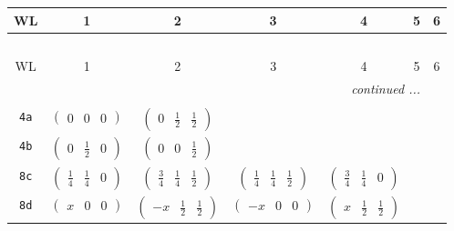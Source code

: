 \documentclass[fleqn,9pt,landscape]{jsarticle}
\begin{document}
\begin{center}
\renewcommand{\arraystretch}{1.2}
\begin{longtable}{ccccccc}
 \hline \hline
WL & 1 & 2 & 3 & 4 & 5 & 6 \\ \hline \endfirsthead

\multicolumn{6}{l}{\tablename\ \thetable{}} \\
 \hline \hline
WL & 1 & 2 & 3 & 4 & 5 & 6 \\ \hline \endhead

 \hline \hline
\multicolumn{6}{r}{\footnotesize\it continued ...} \\ \endfoot

 \hline \hline
\multicolumn{6}{r}{} \\ \endlastfoot

{\tt 4a} & $ \begin{pmatrix} 0 & 0 & 0 \end{pmatrix} $ & $ \begin{pmatrix} 0 & \frac{1}{2} & \frac{1}{2} \end{pmatrix} $ & $  $ & $  $ & $  $ & $  $ \\ \hline
{\tt 4b} & $ \begin{pmatrix} 0 & \frac{1}{2} & 0 \end{pmatrix} $ & $ \begin{pmatrix} 0 & 0 & \frac{1}{2} \end{pmatrix} $ & $  $ & $  $ & $  $ & $  $ \\ \hline
{\tt 8c} & $ \begin{pmatrix} \frac{1}{4} & \frac{1}{4} & 0 \end{pmatrix} $ & $ \begin{pmatrix} \frac{3}{4} & \frac{1}{4} & \frac{1}{2} \end{pmatrix} $ & $ \begin{pmatrix} \frac{1}{4} & \frac{1}{4} & \frac{1}{2} \end{pmatrix} $ & $ \begin{pmatrix} \frac{3}{4} & \frac{1}{4} & 0 \end{pmatrix} $ & $  $ & $  $ \\ \hline
{\tt 8d} & $ \begin{pmatrix} x & 0 & 0 \end{pmatrix} $ & $ \begin{pmatrix} - x & \frac{1}{2} & \frac{1}{2} \end{pmatrix} $ & $ \begin{pmatrix} - x & 0 & 0 \end{pmatrix} $ & $ \begin{pmatrix} x & \frac{1}{2} & \frac{1}{2} \end{pmatrix} $ & $  $ & $  $ \\ \hline

\end{longtable}
\end{center}
\end{document}
